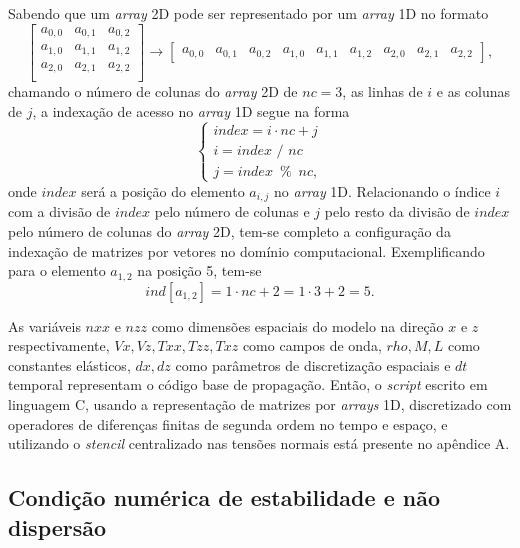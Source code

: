 \documentclass[
	12pt,				%
	openright,			%
	oneside,			%
	a4paper,			%
	english,			%
	brazil				%
	]{abntex2}
\begin{document}
	Sabendo que um \textit{array} 2D pode ser representado por um \textit{array} 1D no formato
%
	\begin{equation}
		\begin{bmatrix}
			a_{0,0} & a_{0,1} & a_{0,2} \\
			a_{1,0} & a_{1,1} & a_{1,2} \\
			a_{2,0} & a_{2,1} & a_{2,2} \\ 
		\end{bmatrix} \to 
		\begin{bmatrix}
			a_{0,0} & a_{0,1} & a_{0,2} &
			a_{1,0} & a_{1,1} & a_{1,2} &
			a_{2,0} & a_{2,1} & a_{2,2}
		\end{bmatrix},
	\end{equation}
%	
	\noindent chamando o número de colunas do \textit{array} 2D de $nc = 3$, as linhas de $i$ e as colunas de $j$, a indexação de acesso no \textit{array} 1D segue na forma
%
	\begin{equation}
		\begin{cases}
			index = i\cdot nc + j \\
			i = index \,\,/ \,\,nc \\
			j = index\,\,\, \% \,\,\,nc,
		\end{cases}
	\end{equation}
%	
	\noindent onde $index$ será a posição do elemento $a_{i,j}$ no \textit{array} 1D. Relacionando o índice $i$ com a divisão de $index$ pelo número de colunas e $j$ pelo resto da divisão de $index$ pelo número de colunas do \textit{array} 2D, tem-se completo a configuração da indexação de matrizes por vetores no domínio computacional. Exemplificando para o elemento $a_{1,2}$ na posição 5, tem-se 
%
	\begin{equation}
		ind[a_{1,2}] = 1\cdot nc + 2 = 1\cdot 3 + 2 = 5.
	\end{equation}	

	As variáveis $nxx$ e $nzz$ como dimensões espaciais do modelo na direção $x$ e $z$ respectivamente, $Vx,Vz,Txx,Tzz,Txz$ como campos de onda, $rho,M,L$ como constantes elásticos, $dx,dz$ como parâmetros de discretização espaciais e $dt$ temporal representam o código base de propagação. Então, o \textit{script} escrito em linguagem C, usando a representação de matrizes por \textit{arrays} 1D, discretizado com operadores de diferenças finitas de segunda ordem no tempo e espaço, e utilizando o \textit{stencil} centralizado nas tensões normais está presente no apêndice A.

\subsection*{Condição numérica de estabilidade e não dispersão}
\end{document}
